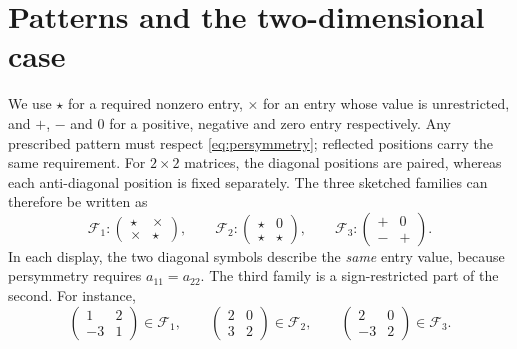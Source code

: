 \documentclass[11pt,a4paper]{article}
\begin{document}
\section{Patterns and the two-dimensional case}

We use $\star$ for a required nonzero entry, $\times$ for an entry
whose value is unrestricted, and $+$, $-$ and $0$ for a positive, negative and
zero entry respectively. Any prescribed pattern must respect
\eqref{eq:persymmetry}; reflected positions carry the same requirement.
For $2\times2$ matrices, the diagonal positions are paired, whereas each
anti-diagonal position is fixed separately. The three sketched families can
therefore be written as
\[
 \mathcal F_1:\begin{pmatrix}\star&\times\\\times&\star\end{pmatrix},
 \qquad
 \mathcal F_2:\begin{pmatrix}\star&0\\\star&\star\end{pmatrix},
 \qquad
 \mathcal F_3:\begin{pmatrix}+&0\\-&+\end{pmatrix}.
\]
In each display, the two diagonal symbols describe the \emph{same} entry
value, because persymmetry requires $a_{11}=a_{22}$. The third family is a
sign-restricted part of the second. For instance,
\[
 \begin{pmatrix}1&2\\-3&1\end{pmatrix}\in\mathcal F_1,
 \qquad
 \begin{pmatrix}2&0\\3&2\end{pmatrix}\in\mathcal F_2,
 \qquad
 \begin{pmatrix}2&0\\-3&2\end{pmatrix}\in\mathcal F_3.
\]
\end{document}

